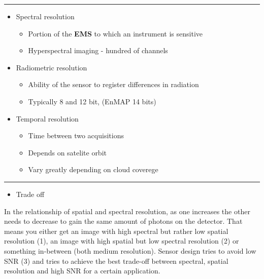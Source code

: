 \documentclass[12pt,preprintnumbers,amsmath,amssymb,nofootinbib,superscriptaddress]{revtex4-1}
\begin{document}

\newpage
{}
\vspace{-0.2cm}
\hrule
\vspace{0.8cm}
\begin{minipage}{0.6\textwidth}

\begin{itemize}
  \item Spectral resolution
  \begin{itemize}
    \item Portion of the \textbf{EMS} to which an instrument is sensitive
    \item Hyperspectral imaging - hundred of channels
  \end{itemize}
  \item Radiometric resolution
  \begin{itemize}
    \item Ability of the sensor to register differences in radiation
    \item Typically 8 and 12 bit, (EnMAP 14 bits)
  \end{itemize}
  \item Temporal resolution
  \begin{itemize}
    \item Time between two acquisitions
    \item Depends on satelite orbit 
    \item Vary greatly depending on cloud coverege
  \end{itemize}
\end{itemize}

\end{minipage}
\vspace{\fill}


\newpage
{}
\vspace{-0.2cm}
\hrule
\vspace{0.8cm}
\begin{minipage}{0.6\textwidth}
\begin{itemize}
  \item Trade off
\end{itemize}

In the relationship of spatial and spectral
resolution, as one increases the other needs to decrease to gain the same amount
of photons on the detector. That means you either get an image with high spectral
but rather low spatial resolution (1), an image with high spatial but low spectral
resolution (2) or something in-between (both medium resolution). Sensor design tries
to avoid low SNR (3) and tries to achieve the best trade-off between spectral, spatial
resolution and high SNR for a certain application.

\end{minipage}
\vspace{\fill}
\end{document}
